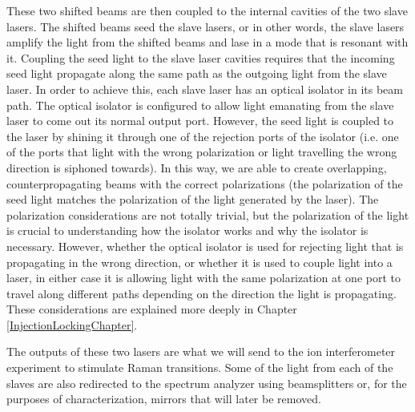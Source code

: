 These two shifted beams are then coupled to the internal cavities of the two slave lasers. The shifted beams seed the slave lasers, or in other words, the slave lasers amplify the light from the shifted beams and lase in a mode that is resonant with it. Coupling the seed light to the slave laser cavities requires that the incoming seed light propagate along the same path as the outgoing light from the slave laser. In order to achieve this, each slave laser has an optical isolator in its beam path. The optical isolator is configured to allow light emanating from the slave laser to come out its normal output port. However, the seed light is coupled to the laser by shining it through one of the rejection ports of the isolator (i.e. one of the ports that light with the wrong polarization or light travelling the wrong direction is siphoned towards). In this way, we are able to create overlapping, counterpropagating beams with the correct polarizations (the polarization of the seed light matches the polarization of the light generated by the laser). The polarization considerations are not totally trivial, but the polarization of the light is crucial to understanding how the isolator works and why the isolator is necessary. However, whether the optical isolator is used for rejecting light that is propagating in the wrong direction, or whether it is used to couple light into a laser, in either case it is allowing light with the same polarization at one port to travel along different paths depending on the direction the light is propagating. 
These considerations are explained more deeply in Chapter\,\ref{InjectionLockingChapter}. 

The outputs of these two lasers are what we will send to the ion interferometer experiment to stimulate Raman transitions. Some of the light from each of the slaves are also redirected to the spectrum analyzer using beamsplitters or, for the purposes of characterization, mirrors that will later be removed.


